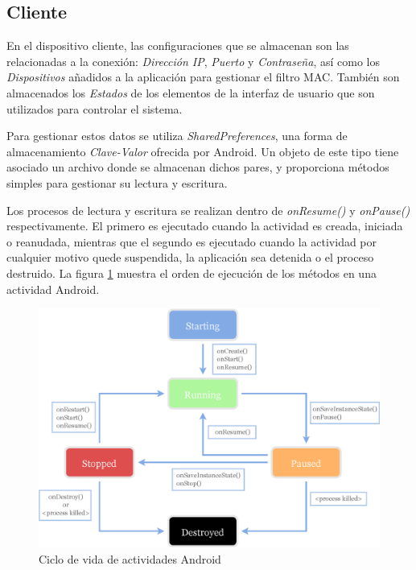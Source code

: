 \documentclass[12pt, twoside]{article}
\begin{document}
    \subsection{Cliente}
        En el dispositivo cliente, las configuraciones que se almacenan son las relacionadas a la conexión: \textit{Dirección IP}, \textit{Puerto} y \textit{Contraseña}, así como los \textit{Dispositivos} añadidos a la aplicación para gestionar el filtro MAC. También son almacenados los \textit{Estados} de los elementos de la interfaz de usuario que son utilizados para controlar el sistema.

        Para gestionar estos datos se utiliza \textit{SharedPreferences}, una forma de almacenamiento \textit{Clave-Valor} ofrecida por Android. Un objeto de este tipo tiene asociado un archivo donde se almacenan dichos pares, y proporciona métodos simples para gestionar su lectura y escritura.
        
        Los procesos de lectura y escritura se realizan dentro de \textit{onResume()} y \textit{onPause()} respectivamente. El primero es ejecutado cuando la actividad es creada, iniciada o reanudada, mientras que el segundo es ejecutado cuando la actividad por cualquier motivo quede suspendida, la aplicación sea detenida o el proceso destruido. La figura \ref{fig:android_lifecycle} muestra el orden de ejecución de los métodos en una actividad Android.
        
        \begin{figure}[h!]
            \centering
                \includegraphics[scale=0.7]{android_lifecycle.eps}
                \caption{Ciclo de vida de actividades Android}
                \label{fig:android_lifecycle}
        \end{figure}
\end{document}
